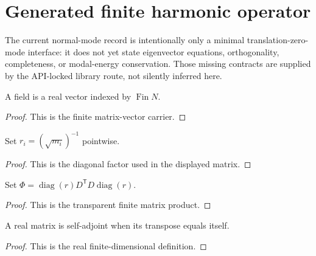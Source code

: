 
\chapter{Generated finite harmonic operator}
\label{ch:ArchonPhysics_Generated_problem_harmonic_operator}

The current normal-mode record is intentionally only a minimal translation-zero-mode interface: it does not yet state eigenvector equations, orthogonality, completeness, or modal-energy conservation. Those missing contracts are supplied by the API-locked library route, not silently inferred here.

\begin{definition}
\label{def:harmonic:field}
A field is a real vector indexed by $\operatorname{Fin}N$.
\end{definition}
\begin{proof}This is the finite matrix-vector carrier.\end{proof}

\begin{definition}
\label{def:harmonic:inverse-sqrt-mass}
Set $r_i=(\sqrt{m_i})^{-1}$ pointwise.
\end{definition}
\begin{proof}This is the diagonal factor used in the displayed matrix.\end{proof}

\begin{definition}
\label{def:harmonic:matrix}
Set $\Phi=\operatorname{diag}(r)D^\mathsf TD\operatorname{diag}(r)$.
\end{definition}
\begin{proof}This is the transparent finite matrix product.\end{proof}

\begin{definition}
\label{def:harmonic:self-adjoint}
A real matrix is self-adjoint when its transpose equals itself.
\end{definition}
\begin{proof}This is the real finite-dimensional definition.\end{proof}


